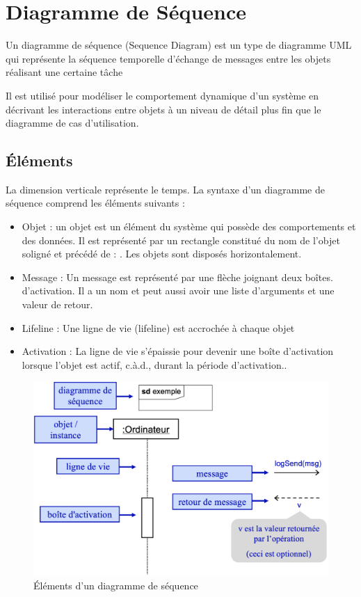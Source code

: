 \section{Diagramme de Séquence}\label{sec:diagramme_sequence}

\begin{definition}
Un diagramme de séquence (Sequence Diagram) est un type de diagramme UML qui représente la séquence temporelle d’échange de messages entre les objets réalisant une certaine tâche
\end{definition}

Il est utilisé pour modéliser le comportement dynamique d'un système en décrivant les interactions entre objets à un niveau de détail plus fin que le diagramme de cas d'utilisation.




\subsection{Éléments}
La dimension verticale représente le temps.
La syntaxe d'un diagramme de séquence comprend les éléments suivants :
\begin{itemize}
\item Objet : un objet est un élément du système qui possède des comportements et des données. Il est représenté par un rectangle constitué du nom de l'objet soligné et précédé de : . Les objets sont disposés horizontalement.
\item Message : Un message est représenté par une flèche joignant deux boîtes. d’activation. Il a un nom et peut aussi avoir une liste d’arguments et une valeur de retour.
\item Lifeline :  Une ligne de vie (lifeline) est accrochée à chaque objet
\item Activation : La ligne de vie s’épaissie pour devenir une boîte d’activation lorsque l’objet est actif, c.à.d., durant la période d’activation..
\end{itemize}

\begin{figure}[H]
\centering
\includegraphics[width=\textwidth]{./Images/Diagrammes/diagram_sequence_elements.png}
\caption{Éléments d'un diagramme de séquence}
\label{fig:diagram_sequence_elements}
\end{figure}



